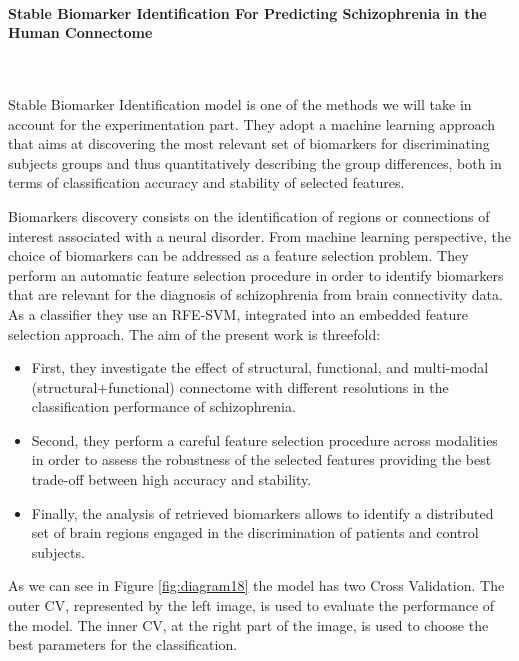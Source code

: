 \paragraph{Stable Biomarker Identification For Predicting Schizophrenia in the Human Connectome}\
\label{par:4}
\vspace{0.5cm}

Stable Biomarker Identification model \cite{GutierrezBio} is one of the methods we will take in account for the experimentation part. They adopt a machine learning approach that aims at discovering the most relevant set of biomarkers for discriminating subjects groups and thus quantitatively describing the group differences, both in terms of classification accuracy and stability of selected features. 
\vspace{0.5cm}

Biomarkers discovery consists on the identification of regions or connections of interest associated with a neural disorder. From machine learning perspective, the choice of biomarkers can be addressed as a feature selection problem. They perform an automatic feature selection procedure in order to identify biomarkers that are relevant for the diagnosis of schizophrenia from brain connectivity data. As a classifier they use an RFE-SVM, integrated into an embedded feature selection approach. The aim of the present work is threefold:

\begin{itemize}
	\item First, they investigate the effect of structural, functional, and multi-modal (structural+functional) connectome with different resolutions in the classification performance of schizophrenia.
	\item Second, they perform a careful feature selection procedure across modalities in order to assess the robustness of the selected features providing the best trade-off between high accuracy and stability. 
	\item Finally, the analysis of retrieved biomarkers allows to identify a distributed set of brain regions engaged in the discrimination of patients and control subjects.
\end{itemize}  

As we can see in Figure \ref{fig:diagram18} the model has two Cross Validation. The outer CV, represented by the left image, is used to evaluate the performance of the model. The inner CV, at the right part of the image, is used to choose the best parameters for the classification.
\vspace{0.5cm}

